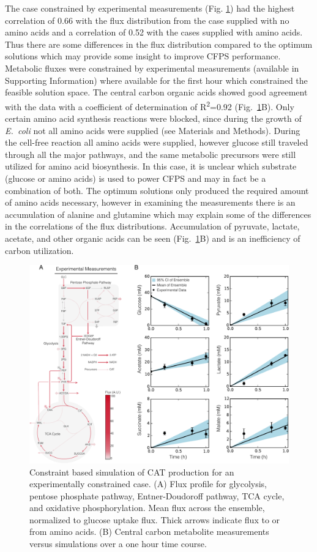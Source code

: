 \documentclass[journal=asbcd6,manuscript=article]{achemso}
\begin{document}
The case constrained by experimental measurements (Fig. \ref{fig:flux_exp}) had the highest correlation of 0.66 with the flux distribution from the case supplied with no amino acids and a correlation of 0.52 with the cases supplied with amino acids.
Thus there are some differences in the flux distribution compared to the optimum solutions which may provide some insight to improve CFPS performance.
Metabolic fluxes were constrained by experimental measurements (available in Supporting Information) where available for the first hour
which constrained the feasible solution space.
The central carbon organic acids showed good agreement with the data with a coefficient of determination of R\textsuperscript{2}=0.92 (Fig.~\ref{fig:flux_exp}B).
Only certain amino acid synthesis reactions were blocked, since during the growth of \emph{E.~coli} not all amino acids were supplied (see Materials and Methods).
During the cell-free reaction all amino acids were supplied, however glucose still traveled through all the major pathways, and the same metabolic precursors were still utilized for amino acid biosynthesis.
In this case, it is unclear which substrate (glucose or amino acids) is used to power CFPS and may in fact be a combination of both.
The optimum solutions only produced the required amount of amino acids necessary, however in examining the measurements there is an accumulation of alanine and glutamine which may explain some of the differences in the correlations of the flux distributions.
Accumulation of pyruvate, lactate, acetate, and other organic acids can be seen (Fig.~\ref{fig:flux_exp}B) and is an inefficiency of carbon utilization.
\begin{figure}[t!]
\includegraphics[width=1.00\textwidth]{./figs/Fig-6-FluxDistribition-Experimental.pdf}
\caption{Constraint based simulation of CAT production for an experimentally constrained case. (A) Flux profile for glycolysis, pentose phosphate pathway, Entner-Doudoroff pathway, TCA cycle, and oxidative phosphorylation.  Mean flux across the ensemble, normalized to glucose uptake flux. Thick arrows indicate flux to or from amino acids. (B) Central carbon metabolite measurements versus simulations over a one hour time course.}
\label{fig:flux_exp}
\end{figure}
\end{document}
